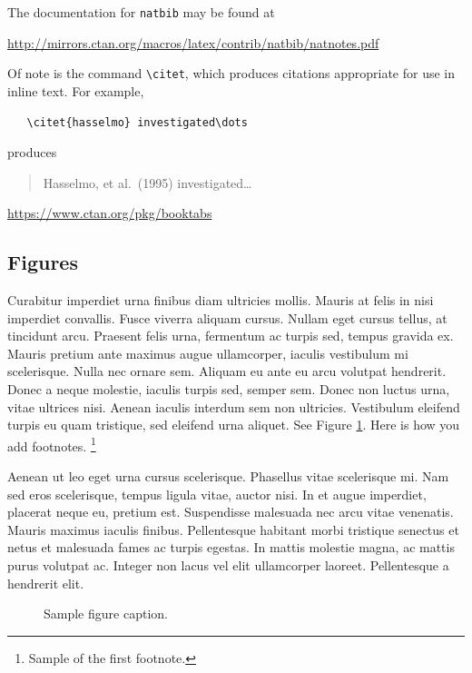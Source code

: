 \documentclass{article}
\begin{document}
The documentation for \verb+natbib+ may be found at
\begin{center}
  \url{http://mirrors.ctan.org/macros/latex/contrib/natbib/natnotes.pdf}
\end{center}
Of note is the command \verb+\citet+, which produces citations
appropriate for use in inline text.  For example,
\begin{verbatim}
   \citet{hasselmo} investigated\dots
\end{verbatim}
produces
\begin{quote}
  Hasselmo, et al.\ (1995) investigated\dots
\end{quote}

\begin{center}
  \url{https://www.ctan.org/pkg/booktabs}
\end{center}


\subsection{Figures}
Curabitur imperdiet urna finibus diam ultricies mollis. Mauris at felis in nisi imperdiet convallis. Fusce viverra aliquam cursus. Nullam eget cursus tellus, at tincidunt arcu. Praesent felis urna, fermentum ac turpis sed, tempus gravida ex. Mauris pretium ante maximus augue ullamcorper, iaculis vestibulum mi scelerisque. Nulla nec ornare sem. Aliquam eu ante eu arcu volutpat hendrerit. Donec a neque molestie, iaculis turpis sed, semper sem. Donec non luctus urna, vitae ultrices nisi. Aenean iaculis interdum sem non ultricies. Vestibulum eleifend turpis eu quam tristique, sed eleifend urna aliquet. 
See Figure \ref{fig:fig2}. Here is how you add footnotes. \footnote{Sample of the first footnote.}


Aenean ut leo eget urna cursus scelerisque. Phasellus vitae scelerisque mi. Nam sed eros scelerisque, tempus ligula vitae, auctor nisi. In et augue imperdiet, placerat neque eu, pretium est. Suspendisse malesuada nec arcu vitae venenatis. Mauris maximus iaculis finibus. Pellentesque habitant morbi tristique senectus et netus et malesuada fames ac turpis egestas. In mattis molestie magna, ac mattis purus volutpat ac. Integer non lacus vel elit ullamcorper laoreet. Pellentesque a hendrerit elit. 

\begin{figure}
  \centering
  \fbox{\rule[-.5cm]{4cm}{4cm} \rule[-.5cm]{4cm}{0cm}}
  \caption{Sample figure caption.}
  \label{fig:fig2}
\end{figure}
\end{document}
